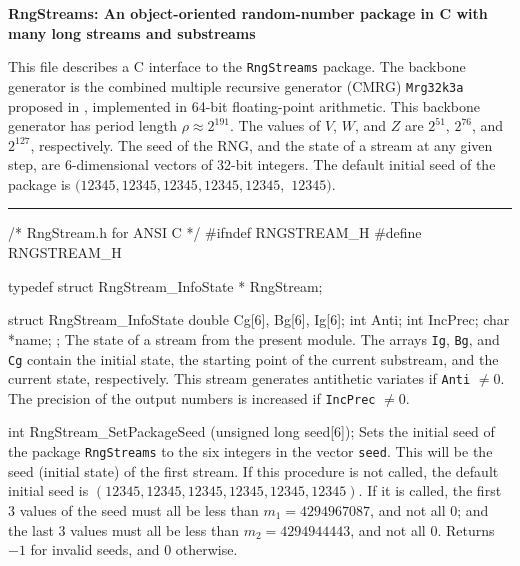 \documentclass[12pt]{article}
\begin{document}
\begin{center}
{\large\bf RngStreams: An object-oriented random-number package in C
 with many long streams and substreams}
\end{center}


\bigskip


This file describes a C interface to the {\tt RngStreams} package.
The backbone generator is the combined multiple recursive 
generator (CMRG) {\tt Mrg32k3a} proposed in \cite{rLEC99b},
implemented in 64-bit floating-point arithmetic.
This backbone generator has period length $\rho\approx 2^{191}$.
The values of $V$, $W$, and $Z$ are $2^{51}$, $2^{76}$, and $2^{127}$,
respectively. %
The seed of the RNG, and the state of a stream at any given step,
are 6-dimensional vectors of 32-bit integers.
The default initial seed of the package is 
$(12345, 12345, 12345, 12345, 12345,$  $12345)$.




\bigskip\hrule

\code\hide
/* RngStream.h for ANSI C */
#ifndef RNGSTREAM_H
#define RNGSTREAM_H
\endhide


typedef struct RngStream_InfoState * RngStream;

struct RngStream_InfoState {
   double Cg[6], Bg[6], Ig[6];
   int Anti;
   int IncPrec;
   char *name;
};
\endcode
 \tab
   The state of a stream from the present module.
   The arrays {\tt Ig}, {\tt Bg}, and {\tt Cg} contain the initial state, 
   the starting point of the current substream,
   and the current state, respectively.
   This stream generates antithetic variates if {\tt Anti} $\neq 0$.
   The precision of the output numbers is increased if {\tt IncPrec} $\neq 0$.
 \endtab
\code

int RngStream_SetPackageSeed (unsigned long seed[6]);
\endcode
  \tab  Sets the initial seed of the package {\tt RngStreams} to the 
   six integers in the vector {\tt seed}.
   This will be the seed (initial state) of the first stream.
   If this procedure is not called, the default initial seed
   is $(12345, 12345, 12345, 12345, 12345, 12345)$.
   If it is called, the first 3 values of the seed must all be
   less than $m_1 = 4294967087$, and not all 0;
   and the last 3 values 
   must all be less than $m_2 = 4294944443$, and not all 0.
   Returns $-1$ for invalid seeds, and 0 otherwise.
 \endtab
\code
\end{document}
